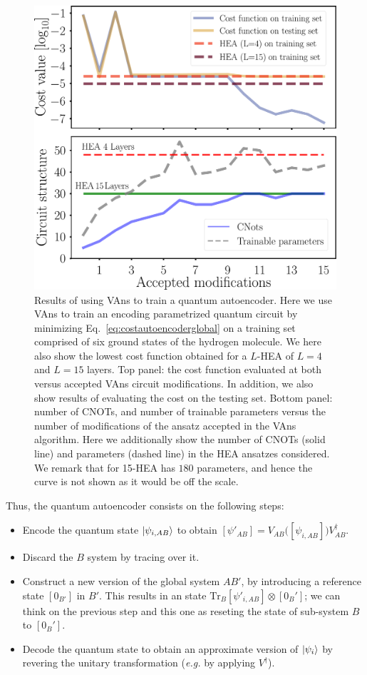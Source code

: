 \begin{figure}[t!]
\centering
\includegraphics[width=.8\textwidth]{Figures/VANS/Fig11.pdf}
\caption{ {\small Results of using VAns to train a quantum autoencoder. Here we use VAns to train an encoding parametrized quantum circuit by minimizing Eq.~\eqref{eq:costautoencoderglobal} on a training set comprised of six ground states of the hydrogen molecule. We here also show the lowest cost function obtained for a $L$-HEA of $L=4$ and $L=15$ layers. Top panel: the cost function evaluated at both versus accepted VAns circuit modifications. In addition, we also show results of evaluating the cost on the testing set. Bottom panel: number of CNOTs, and number of trainable parameters versus the number of modifications of the ansatz accepted in the VAns algorithm. Here we additionally  show the number of CNOTs (solid line) and parameters (dashed line) in the HEA ansatzes considered. We remark that for 15-HEA has $180$ parameters, and hence the curve is not shown as it would be off the scale.}
}
\label{fig:AE_results}
\end{figure}
%

Thus, the quantum autoencoder consists on the following steps:
\begin{itemize}
\item Encode the quantum state $\ket{\psi_{i,AB}}$ to obtain $[\psi'_{AB}] = V_{AB} \Big( [\psi_{i,AB}]\Big) V_{AB}^\dagger$.
\item Discard the $B$ system by tracing over it.
\item Construct a new version of the global system $AB'$, by introducing a reference state $[0_{B'}]$ in $B'$. This results in an state $\text{Tr}_B [\psi'_{i,AB}] \otimes [0_B']$; we can think on the previous step and this one as reseting the state of sub-system $B$ to $[0_B']$.
\item Decode the quantum state to obtain an approximate version of $\ket{\psi_i}$ by revering the unitary transformation (\textit{e.g.} by applying $V^\dagger$).
\end{itemize}

